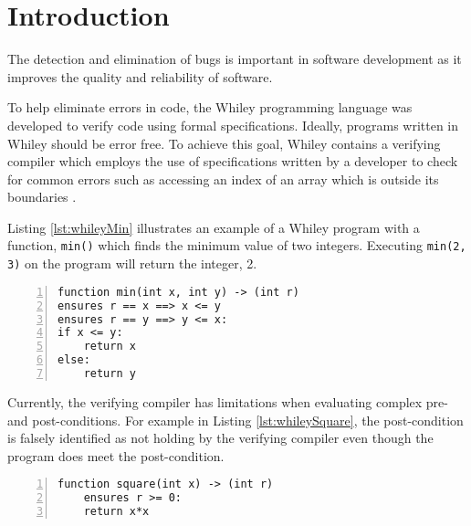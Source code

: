 \chapter{Introduction}\label{chapter:intro}



The detection and elimination of bugs is important in software development as it improves the quality and reliability of software.

To help eliminate errors in code, the Whiley programming language was developed to verify code using formal specifications.
Ideally, programs written in Whiley should be error free.
To achieve this goal, Whiley contains a verifying compiler which employs the use of specifications written by a developer to check for common errors such as accessing an index of an array which is outside its boundaries \cite{WhileyLang}.

Listing \ref{lst:whileyMin} illustrates an example of a Whiley program with a function,  \texttt{min()} which finds the minimum value of two integers. Executing \texttt{min(2, 3)} on the program will return the integer, 2.

\begin{lstlisting}[language=Whiley, tabsize=3, numbers=left,
label={lst:whileyMin}, caption={Whiley program for the min function}]
function min(int x, int y) -> (int r)
ensures r == x ==> x <= y
ensures r == y ==> y <= x:
if x <= y:
	return x
else:
	return y
\end{lstlisting}

Currently, the verifying compiler has limitations when evaluating complex pre- and post-conditions.
For example in Listing \ref{lst:whileySquare}, the post-condition is falsely identified as not holding by the verifying compiler even though the program does meet the post-condition.

\begin{lstlisting}[language=Whiley, tabsize=3, numbers=left,
label={lst:whileySquare}, caption={Whiley program for the square function}]
function square(int x) -> (int r)
	ensures r >= 0:
	return x*x
\end{lstlisting}

